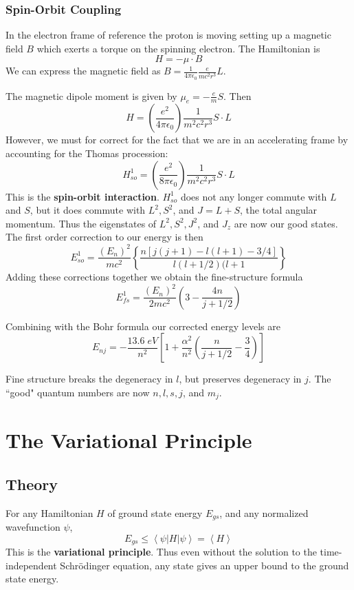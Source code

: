 \documentclass[12pt, a4paper, oneside, openright, titlepage]{book}
\newcommand{\brkt}[1]{\left\langle #1\right\rangle}
\begin{document}
\subsection{Spin-Orbit Coupling}

In the electron frame of reference the proton is moving setting up a magnetic field $B$ which exerts a torque on the spinning electron. The Hamiltonian is $$H = -\mu\cdot B$$
We can express the magnetic field as $B = \frac{1}{4\pi\epsilon_0}\frac{e}{mc^2r^3}L$. 

The magnetic dipole moment is given by $\mu_e = -\frac{e}{m}S$. Then $$H = \left(\frac{e^2}{4\pi\epsilon_0}\right)\frac{1}{m^2c^2r^3}S\cdot L$$
However, we must for correct for the fact that we are in an accelerating frame by accounting for the Thomas procession: $$H_{so}^1 = \left(\frac{e^2}{8\pi\epsilon_0}\right)\frac{1}{m^2c^2r^3}S\cdot L$$
This is the \textbf{spin-orbit interaction}. $H_{so}^1$ does not any longer commute with $L$ and $S$, but it does commute with $L^2,S^2$, and $J = L+S$, the total angular momentum. Thus the eigenstates of $L^2,S^2,J^2$, and $J_z$ are now our good states. The first order correction to our energy is then $$E_{so}^1 = \frac{(E_n)^2}{mc^2}\left\{\frac{n[j(j+1)-l(l+1)-3/4]}{l(l+1/2)(l+1}\right\}$$
Adding these corrections together we obtain the fine-structure formula $$E_{fs}^1 = \frac{(E_n)^2}{2mc^2}\left(3-\frac{4n}{j+1/2}\right)$$


Combining with the Bohr formula our corrected energy levels are $$E_{nj} = -\frac{13.6\;eV}{n^2}\left[1+\frac{\alpha^2}{n^2}\left(\frac{n}{j+1/2}-\frac{3}{4}\right)\right]$$

Fine structure breaks the degeneracy in $l$, but preserves degeneracy in $j$. The ``good" quantum numbers are now $n,l,s,j$, and $m_j$.



\chapter{The Variational Principle}

\section{Theory}

For any Hamiltonian $H$ of ground state energy $E_{gs}$, and any normalized wavefunction $\psi$, $$E_{gs} \leq \brkt{\psi|H|\psi} = \brkt{H}$$
This is the \textbf{variational principle}. Thus even without the solution to the time-independent Schr\"{o}dinger equation, any state gives an upper bound to the ground state energy.
\end{document}
